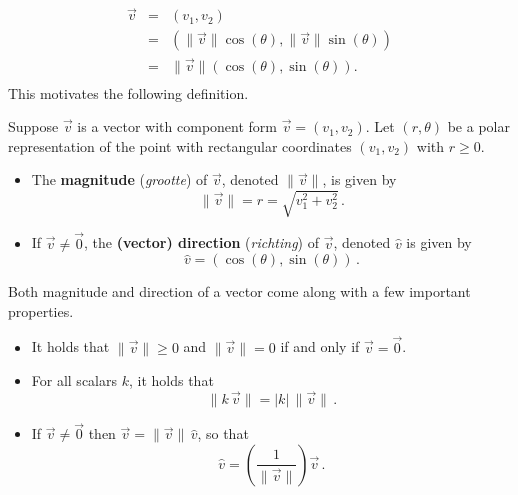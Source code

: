 \[ \begin{array}{rcl} \vec{v} & = & \left( v_1 , v_2  \right) \\ [3pt]
															& = & \left( \| \vec{v} \| \cos(\theta), \| \vec{v} \| \sin(\theta) \right) \\ [3pt]
													    & = &  \| \vec{v} \| \left( \cos(\theta),\sin(\theta) \right). \\ \end{array} \]
This motivates the following definition.

\begin{definition} \label{polarformvector} 
 Suppose $\vec{v}$ is a vector with component form $\vec{v} =\left( v_1 , v_2  \right)$.  Let $(r,\theta)$ be a polar representation of the point with rectangular coordinates $\left(v_1 ,v_2  \right)$ with $r \geq 0$.
\begin{itemize}

\item  The \textbf{magnitude} (\textit{grootte})   of $\vec{v}$, denoted $\| \vec{v} \|$, is given by 
$$\| \vec{v} \| = r =   \sqrt{v_1^2 + v_2^2}\,.$$

\item If $\vec{v} \neq \vec{0}$,  the \textbf{(vector) direction} (\textit{richting})   of $\vec{v}$, denoted $\hat{v}$ is given by  
$$\hat{v} = \left( \cos(\theta), \sin(\theta) \right)\,.$$

\end{itemize}

\end{definition}

\fi

Both magnitude and direction of a vector come along with a few important properties.


\begin{itemize}

\item It holds  that $\| \vec{v} \| \geq 0$ and $\| \vec{v} \| = 0$ if and only if $\vec{v} = \vec{0}$.

\item  For all scalars $k$, it holds that 
$$
\| k \, \vec{v} \| = |k| \, \| \vec{v} \|\,.
$$

\item  If $\vec{v} \neq \vec{0}$ then $\vec{v} = \| \vec{v} \|\, \hat{v}$, so that 
\begin{equation}
\hat{v} = \left(\frac{1}{\|\vec{v}\|}\right) \vec{v}\,.
\label{propdir3}
\end{equation}
\end{itemize}

